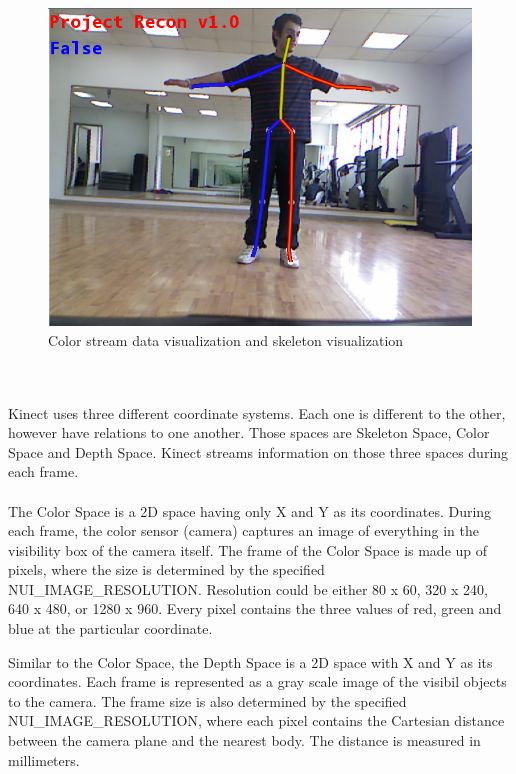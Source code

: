 \begin{figure}[ht]
\centering
\includegraphics[scale=1]{images/color_skeleton.png}
\caption{Color stream data visualization and skeleton visualization}
\label{4.5}
\end{figure}
\\
\\

Kinect uses three different coordinate systems. Each one is different to the other, however have relations to one another. Those spaces are Skeleton Space, Color Space and Depth Space. Kinect streams information on those three spaces during each frame.
\\
\\
The Color Space is a 2D space having only X and Y as its coordinates. During each frame, the color sensor (camera) captures an image of everything in the visibility box of the camera itself. The frame of the Color Space is made up of pixels, where the size is determined by the specified NUI\_IMAGE\_RESOLUTION. Resolution could be either 80 x 60, 320 x 240, 640 x 480, or 1280 x 960. Every pixel contains the three values of red, green and blue at the particular coordinate.


Similar to the Color Space, the Depth Space is a 2D space with X and Y as its coordinates. Each frame is represented as a gray scale image of the visibil objects to the camera. The frame size is also determined by the specified NUI\_IMAGE\_RESOLUTION, where each pixel contains the Cartesian distance between the camera plane and the nearest body. The distance is measured in millimeters.


